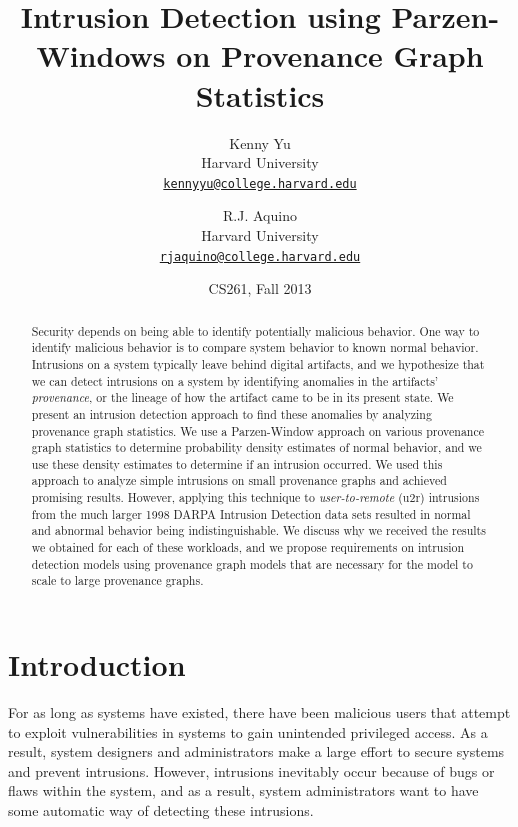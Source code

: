 \documentclass[10pt,twocolumn]{article}
\title{{\bf Intrusion Detection using Parzen-Windows on Provenance Graph Statistics}}
\author{
    Kenny Yu\\
    Harvard University\\
    \href{mailto:kennyyu@college.harvard.edu}{\texttt{kennyyu@college.harvard.edu}}
  \and
    R.J. Aquino\\
    Harvard University\\
    \href{mailto:rjaquino@college.harvard.edu}{\texttt{rjaquino@college.harvard.edu}}
}
\date{CS261, Fall 2013}
\begin{document}
\maketitle

%

\begin{abstract}
Security depends on being able to identify potentially malicious behavior.
One way to identify malicious behavior is to compare system behavior to known normal behavior.
Intrusions on a system typically leave behind digital artifacts, and we hypothesize
that we can detect intrusions on a system by identifying anomalies in the artifacts' {\em provenance}, or the lineage of how
the artifact came to be in its present state.
We present an intrusion detection approach to find these anomalies by analyzing provenance graph statistics. We use a Parzen-Window approach \cite{parzen} on various provenance graph statistics \cite{clustering} 
to determine probability density estimates of normal behavior, and we use these density estimates to 
determine if an intrusion occurred. We used this approach to analyze simple intrusions on small provenance graphs and achieved promising results. However, applying this technique to {\em user-to-remote} (u2r) intrusions 
from the much larger 1998 DARPA Intrusion Detection data sets  \cite{darpa} resulted in normal and abnormal behavior being indistinguishable. We discuss why we received the results we obtained for each of these workloads, and we propose requirements on intrusion detection models using provenance graph models that are necessary for the model to scale to large provenance graphs.

\end{abstract}

%

\section{Introduction}

For as long as systems have existed, there have been malicious users that attempt to exploit vulnerabilities
in systems to gain unintended privileged access. As a result, system designers and 
administrators make a large effort to secure systems and prevent intrusions. However, intrusions
inevitably occur because of bugs or flaws within the system, and as a result, system administrators want to
have some automatic way of detecting these intrusions. 
\end{document}
